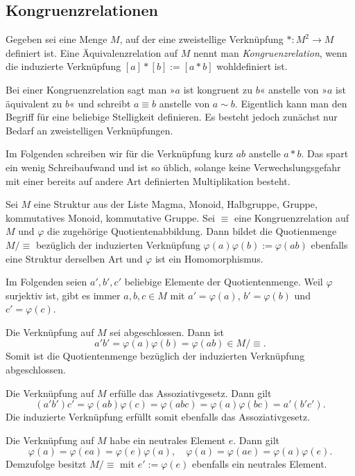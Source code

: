 \subsection{Kongruenzrelationen}

\begin{Definition}[Kongruenzrelation]%
\newlinefirst
Gegeben sei eine Menge $M$, auf der eine zweistellige
Verknüpfung $*\colon M^2\to M$ definiert ist. Eine Äquivalenzrelation
auf $M$ nennt man \emph{Kongruenzrelation}, wenn die induzierte Verknüpfung
$[a]*[b]:=[a*b]$ wohldefiniert ist.
\end{Definition}
Bei einer Kongruenzrelation sagt man »$a$ ist kongruent zu $b$«
anstelle von »$a$ ist äquivalent zu $b$« und schreibt $a\equiv b$
anstelle von $a\sim b$. Eigentlich kann man den Begriff für eine
beliebige Stelligkeit definieren. Es besteht jedoch zunächst nur Bedarf
an zweistelligen Verknüpfungen.

Im Folgenden schreiben wir für die Verknüpfung kurz $ab$ anstelle
$a*b$. Das spart ein wenig Schreibaufwand und ist so üblich, solange
keine Verwechslungsgefahr mit einer bereits auf andere Art definierten
Multiplikation besteht.

\begin{Satz}\label{Kongruenz-Quotient}
Sei $M$ eine Struktur aus der Liste Magma, Monoid, Halbgruppe,
Gruppe, kommutatives Monoid, kommutative Gruppe. Sei $\equiv$ eine
Kongruenzrelation auf $M$ und $\varphi$ die zugehörige
Quotientenabbildung. Dann bildet die Quotienmenge $M/\equiv$
bezüglich der induzierten Verknüpfung $\varphi(a)\varphi(b):=\varphi(ab)$
ebenfalls eine Struktur derselben Art und $\varphi$ ist ein
Homomorphismus.
\end{Satz}
 Im Folgenden seien $a',b',c'$ beliebige Elemente
der Quotientenmenge. Weil $\varphi$ surjektiv ist, gibt es immer
$a,b,c\in M$ mit $a'=\varphi(a)$, $b'=\varphi(b)$ und $c'=\varphi(c)$.

Die Verknüpfung auf $M$ sei abgeschlossen. Dann ist
\[a'b' = \varphi(a)\varphi(b) = \varphi(ab)\in M/\equiv.\]
Somit ist die Quotientenmenge bezüglich der induzierten Verknüpfung
abgeschlossen.

Die Verknüpfung auf $M$ erfülle das Assoziativgesetz. Dann gilt
\[(a'b')c' = \varphi(ab)\varphi(c) = \varphi(abc)
= \varphi(a)\varphi(bc) = a'(b'c').\]
Die induzierte Verknüpfung erfüllt somit ebenfalls das
Assoziativgesetz.

Die Verknüpfung auf $M$ habe ein neutrales Element $e$. Dann gilt
\[\varphi(a)=\varphi(ea) = \varphi(e)\varphi(a),\quad
\varphi(a)=\varphi(ae)=\varphi(a)\varphi(e).\]
Demzufolge besitzt $M/\equiv$ mit $e':=\varphi(e)$ ebenfalls
ein neutrales Element.

